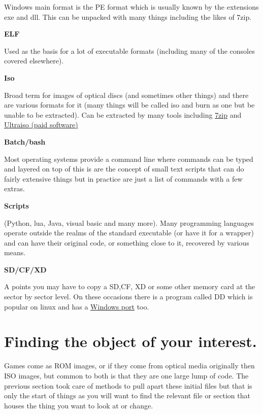 \documentclass[
]{book}
\begin{document}
Windows main format is the PE format which is usually known by the extensions exe and dll. This can be unpacked with many things including the likes of 7zip.

\textbf{ELF}

Used as the basis for a lot of executable formats (including many of the consoles covered elsewhere).

\textbf{Iso}

Broad term for images of optical discs (and sometimes other things) and there are various formats for it (many things will be called iso and burn as one but be unable to be extracted). Can be extracted by many tools including \href{http://www.7-zip.org/}{7zip} and \href{http://www.ezbsystems.com/ultraiso/}{Ultraiso (paid software)}

\textbf{Batch/bash}

Most operating systems provide a command line where commands can be typed and layered on top of this is are the concept of small text scripts that can do fairly extensive things but in practice are just a list of commands with a few extras.

\textbf{Scripts}

(Python, lua, Java, visual basic and many more). Many programming languages operate outside the realms of the standard executable (or have it for a wrapper) and can have their original code, or something close to it, recovered by various means.

\textbf{SD/CF/XD}

A points you may have to copy a SD,CF, XD or some other memory card at the sector by sector level. On these occasions there is a program called DD which is popular on linux and has a \href{http://www.chrysocome.net/dd}{Windows port} too.

\hypertarget{finding-the-object-of-your-interest.}{%
\section{Finding the object of your interest.}\label{finding-the-object-of-your-interest.}}

Games come as ROM images, or if they come from optical media originally then ISO images, but common to both is that they are one large lump of code. The previous section took care of methods to pull apart these initial files but that is only the start of things as you will want to find the relevant file or section that houses the thing you want to look at or change.
\end{document}
